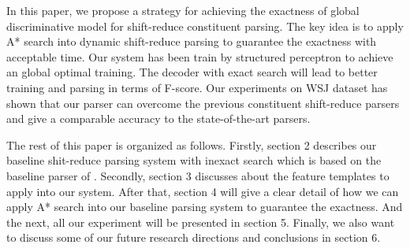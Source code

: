In this paper, we propose a strategy for achieving the exactness of global discriminative model for shift-reduce constituent parsing. The key idea is to apply A* search into \cite{ref:2010Huang} dynamic shift-reduce parsing to guarantee the exactness with acceptable time. Our system has been train by structured perceptron \cite{ref:2004Collins} to achieve an global optimal training. The decoder with exact search will lead to better training and parsing in terms of F-score. Our experiments on WSJ dataset has shown that our parser can overcome the previous constituent shift-reduce parsers and give a comparable accuracy to the state-of-the-art parsers.

The rest of this paper is organized as follows. Firstly, section 2 describes our baseline shit-reduce parsing system with inexact search which is based on the baseline parser of \cite{ref:2012Zhu}. Secondly, section 3 discusses about the feature templates to apply into our system. After that, section 4 will give a clear detail of how we can apply A* search into our baseline parsing system to guarantee the exactness. And the next, all our experiment will be presented in section 5. Finally, we also want to discuss some of our future research directions and conclusions in section 6.